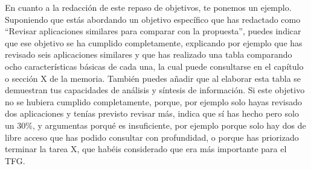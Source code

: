  En cuanto a la redacción de este repaso de objetivos, te ponemos un ejemplo. Suponiendo que estás abordando un objetivo específico que has redactado como ``Revisar aplicaciones similares para comparar con la propuesta'', puedes indicar que ese objetivo se ha cumplido completamente, explicando por ejemplo que has revisado seis aplicaciones similares y que has realizado una tabla comparando ocho características básicas de cada una, la cual puede consultarse en el capítulo o sección X de la memoria. También puedes añadir que al elaborar esta tabla se demuestran tus capacidades de análisis y síntesis de información. Si este objetivo no se hubiera cumplido completamente, porque, por ejemplo solo hayas revisado dos aplicaciones y tenías previsto revisar más, indica que sí has hecho pero solo un 30\%, y argumentas porqué es insuficiente, por ejemplo porque solo hay dos de libre acceso que has podido consultar con profundidad, o porque has priorizado terminar la tarea X, que habéis considerado que era más importante para el TFG. 

 
